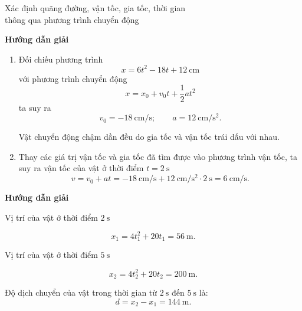 \begin{dang}{Xác định quãng đường, vận tốc, gia tốc, thời gian \\thông qua phương trình chuyển động }
	{	\begin{center}
			\textbf{Hướng dẫn giải}
		\end{center}
		
		\begin{enumerate}[label=\alph*.]
			\item Đối chiếu phương trình 
			$$x = 6t^2 - 18t + 12 \ \text{cm}$$
			với phương trình chuyển động
			$$x=x_0+v_0t+\dfrac{1}{2}at^{2}$$
			ta suy ra
			$$v_0 = \SI{-18}{\centi\meter/\second};\qquad a =\SI{12}{\centi\meter/\second^{2}}.$$
			
			Vật chuyển động chậm dần đều do gia tốc và vận tốc trái dấu với nhau.
			\item Thay các giá trị vận tốc và gia tốc đã tìm được vào phương trình vận tốc, ta suy ra vận tốc của vật ở thời điểm $t=\SI{2}{\second}$
			$$v =v_0 +at =\SI{-18}{\centi\meter/\second}+\SI{12}{\centi\meter/\second^{2}}\cdot\SI{2}{\second}=\SI{6}{\centi\meter/\second}.$$
		\end{enumerate}
	}
	
	{	\begin{center}
			\textbf{Hướng dẫn giải}
		\end{center}
		
		Vị trí của vật ở thời điểm  $\SI{2}{\second}$  
		
		$$x_1 = 4t_1^2 + 20t_1 =\SI{56}{\meter}.$$
		
		Vị trí của vật ở thời điểm  $\SI{5}{\second}$ 
		
		$$x_2 = 4t_2^2 + 20t_2 =\SI{200}{\meter}.$$
		
		Độ dịch chuyển của vật trong thời gian từ $\SI{2}{\second}$  đến $\SI{5}{\second}$ là:
		$$d = x_2 - x_1 = \SI{144}{\meter}.$$
		
}
\end{dang}
